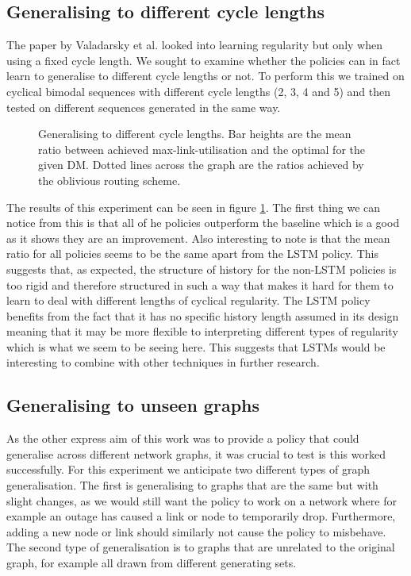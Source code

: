 \subsection{Generalising to different cycle lengths}
The paper by Valadarsky et al. looked into learning regularity but only when using a fixed cycle length. We sought to examine whether the policies can in fact learn to generalise to different cycle lengths or not. To perform this we trained on cyclical bimodal sequences with different cycle lengths (2, 3, 4 and 5) and then tested on different sequences generated in the same way.

\begin{figure}
    \centering
    
    \caption{Generalising to different cycle lengths. Bar heights are the mean ratio between achieved max-link-utilisation and the optimal for the given DM. Dotted lines across the graph are the ratios achieved by the oblivious routing scheme.}
    \label{fig:exp_vary}
\end{figure}

The results of this experiment can be seen in figure \ref{fig:exp_vary}. The first thing we can notice from this is that all of he policies outperform the baseline which is a good as it shows they are an improvement. Also interesting to note is that the mean ratio for all policies seems to be the same apart from the LSTM policy. This suggests that, as expected, the structure of history for the non-LSTM policies is too rigid and therefore structured in such a way that makes it hard for them to learn to deal with different lengths of cyclical regularity. The LSTM policy benefits from the fact that it has no specific history length assumed in its design meaning that it may be more flexible to interpreting different types of regularity which is what we seem to be seeing here. This suggests that LSTMs would be interesting to combine with other techniques in further research.

\subsection{Generalising to unseen graphs}
As the other express aim of this work was to provide a policy that could generalise across different network graphs, it was crucial to test is this worked successfully. For this experiment we anticipate two different types of graph generalisation. The first is generalising to graphs that are the same but with slight changes, as we would still want the policy to work on a network where for example an outage has caused a link or node to temporarily drop. Furthermore, adding a new node or link should similarly not cause the policy to misbehave. The second type of generalisation is to graphs that are unrelated to the original graph, for example all drawn from different generating sets.

